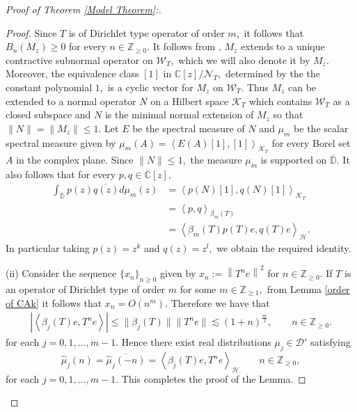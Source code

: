 \documentclass[10pt,oneside,reqno]{amsart}
\theoremstyle{definition}
\theoremstyle{remark}
\newcommand{\calH}{{\mathcal{H}}}
\newcommand{\ip}[1]{\left\langle #1 \right\rangle}
\newcommand{\norm}[1]{\left\lVert #1 \right\rVert}
\newcommand{\D}{\mathbb D}
\numberwithin{equation}{section}
\begin{document}
\begin{proof}[Proof of Theorem \ref{Model Theorem}:]
\begin{proof}
   Since $T$ is of Dirichlet type operator of order $m,$ it follows that $B_{n}(M_z)\geqslant 0$ for every $n\in\mathbb Z_{\geqslant 0}.$ It follows from \cite[Theorem 3.1]{Aglerhyperc}, $M_z$ extends to a unique contractive subnormal operator on $\mathcal W_T,$ which we will also denote it by $M_z.$ Moreover, the equivalence class $[1]$ in  $\mathbb C[z]/{\mathcal N_T},$ determined by the the constant polynomial $1,$ is a cyclic vector for $M_z$  on $\mathcal W_T.$ Thus $M_z$ can be extended to a normal operator $N$ on a Hilbert space $\mathcal K_T$ which contains $\mathcal W_T$ as a closed subspace and $N$ is the minimal normal extension of $M_z$ so that $\|N\|=\|M_z\|\leqslant 1.$ Let $E$ be the spectral measure of $N$ and $\mu_m$ be the scalar spectral measure given by $\mu_m(A)= \ip{E(A)[1],[1]}_{\mathcal K_T}$ for every Borel set $A$ in the complex plane. Since $\|N\|\leqslant 1,$ the measure $\mu_m$ is supported on $\overline{\D}.$ It also follows that for every $p,q\in\mathbb C[z],$
   \begin{align*}
       \int_{\overline{\D}}p(z)\overline{q(z)} d\mu_m(z)&= \ip{p(N)[1],q(N)[1]}_{\mathcal K_T}\\
       &= \ip{p,q}_{\beta_m(T)}\\
     &=\ip{\beta_m(T)p(T)e,q(T)e}_{\mathcal H}.
   \end{align*}
In particular taking $p(z)= z^k$ and $q(z)=z^l,$ we obtain the required identity. 

(\rm ii) Consider the sequence $\{x_n\}_{n\geqslant 0}$ given by $x_n:=\norm{T^ne}^2$  for $n\in\mathbb Z_{\geqslant 0}.$ If $T$ is an operator of Dirichlet type of order $m$ for some $m\in\mathbb Z_{\geqslant 1},$ from Lemma \ref{order of CAk} it follows that  $x_n=O(n^{m}).$  Therefore we have that 
\begin{align*}
    |\ip{\beta_j(T)e, T^ne}|\leqslant \|\beta_j(T)\|\|T^ne\| \lesssim (1+n)^{\frac{m}{2}}, \qquad n\in \mathbb Z_{\geqslant 0}.
\end{align*} 
for each $j=0,1,\ldots,m-1.$ Hence there exist real distributions $\mu_j\in\mathcal D'$ satisfying 
\begin{equation*}
    \hat{\mu}_{j} \left( n \right) = \overline{\hat{\mu}_{j} \left( -n \right)} = \ip{\beta_{j} \left( T \right) e, T^{n}e}_{\calH} \qquad  n \in \mathbb Z_{\geqslant 0},
\end{equation*} for each $j=0,1,\ldots,m-1.$  This completes the proof of the Lemma.
\end{proof}


\end{proof}
\end{document}
